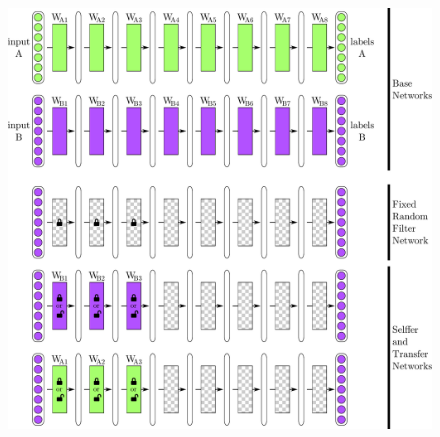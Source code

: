\begin{figure}[htpb]
\begin{center}
\includegraphics[width=1\linewidth]{drawings/transfer.pdf}
\end{center}

\end{figure}
